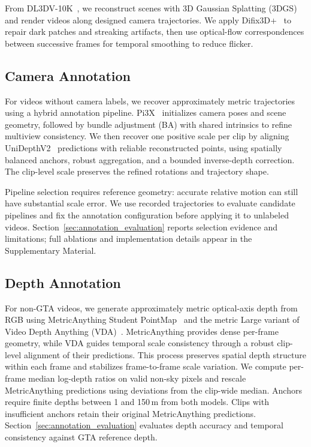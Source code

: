 From DL3DV-10K~\cite{ling2024dl3dv10klargescalescenedataset}, we reconstruct scenes with 3D Gaussian Splatting (3DGS) and render videos along designed camera trajectories.
We apply Difix3D+~\cite{wu2025difix3d} to repair dark patches and streaking artifacts, then use optical-flow correspondences between successive frames for temporal smoothing to reduce flicker.

\subsection{Camera Annotation}
\label{sec:camera_annotation}

For videos without camera labels, we recover approximately metric trajectories using a hybrid annotation pipeline.
Pi3X~\cite{wang2026pi3permutationequivariantvisualgeometry} initializes camera poses and scene geometry, followed by bundle adjustment (BA) with shared intrinsics to refine multiview consistency.
We then recover one positive scale per clip by aligning UniDepthV2~\cite{piccinelli2025unidepthv2} predictions with reliable reconstructed points, using spatially balanced anchors, robust aggregation, and a bounded inverse-depth correction.
The clip-level scale preserves the refined rotations and trajectory shape.

Pipeline selection requires reference geometry: accurate relative motion can still have substantial scale error.
We use recorded trajectories to evaluate candidate pipelines and fix the annotation configuration before applying it to unlabeled videos.
Section~\ref{sec:annotation_evaluation} reports selection evidence and limitations; full ablations and implementation details appear in the Supplementary Material.

\subsection{Depth Annotation}
\label{sec:depth_annotation}

For non-GTA videos, we generate approximately metric optical-axis depth from RGB using MetricAnything Student PointMap~\cite{ma2026metricanything} and the metric Large variant of Video Depth Anything (VDA)~\cite{chen2025videodepthanything}.
MetricAnything provides dense per-frame geometry, while VDA guides temporal scale consistency through a robust clip-level alignment of their predictions.
This process preserves spatial depth structure within each frame and stabilizes frame-to-frame scale variation.
We compute per-frame median log-depth ratios on valid non-sky pixels and rescale MetricAnything predictions using deviations from the clip-wide median.
Anchors require finite depths between 1 and 150\,m from both models.
Clips with insufficient anchors retain their original MetricAnything predictions.
Section~\ref{sec:annotation_evaluation} evaluates depth accuracy and temporal consistency against GTA reference depth.

